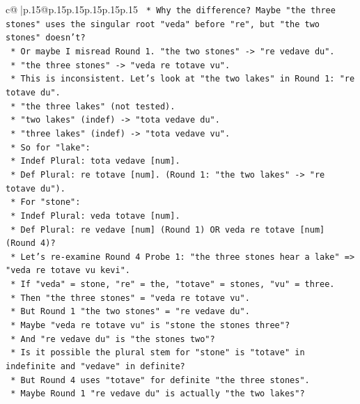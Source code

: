 \documentclass{article}
\begin{document}
{\begin{supertabular}{c@{$\;$}|p{.15\linewidth}@{}p{.15\linewidth}p{.15\linewidth}p{.15\linewidth}p{.15\linewidth}p{.15\linewidth}}
{{{\texttt{        *   Why the difference? Maybe "the three stones" uses the singular root "veda" before "re", but "the two stones" doesn't?} \\
\texttt{        *   Or maybe I misread Round 1. "the two stones" {-}> "re vedave du".} \\
\texttt{        *   "the three stones" {-}> "veda re totave vu".} \\
\texttt{        *   This is inconsistent. Let's look at "the two lakes" in Round 1: "re totave du".} \\
\texttt{        *   "the three lakes" (not tested).} \\
\texttt{        *   "two lakes" (indef) {-}> "tota vedave du".} \\
\texttt{        *   "three lakes" (indef) {-}> "tota vedave vu".} \\
\texttt{        *   So for "lake":} \\
\texttt{            *   Indef Plural: tota vedave {[}num{]}.} \\
\texttt{            *   Def Plural: re totave {[}num{]}. (Round 1: "the two lakes" {-}> "re totave du").} \\
\texttt{        *   For "stone":} \\
\texttt{            *   Indef Plural: veda totave {[}num{]}.} \\
\texttt{            *   Def Plural: re vedave {[}num{]} (Round 1) OR veda re totave {[}num{]} (Round 4)?} \\
\texttt{        *   Let's re{-}examine Round 4 Probe 1: "the three stones hear a lake" => "veda re totave vu kevi".} \\
\texttt{        *   If "veda" = stone, "re" = the, "totave" = stones, "vu" = three.} \\
\texttt{        *   Then "the three stones" = "veda re totave vu".} \\
\texttt{        *   But Round 1 "the two stones" = "re vedave du".} \\
\texttt{        *   Maybe "veda re totave vu" is "stone the stones three"?} \\
\texttt{        *   And "re vedave du" is "the stones two"?} \\
\texttt{        *   Is it possible the plural stem for "stone" is "totave" in indefinite and "vedave" in definite?} \\
\texttt{        *   But Round 4 uses "totave" for definite "the three stones".} \\
\texttt{        *   Maybe Round 1 "re vedave du" is actually "the two lakes"?} \\
}}}
\end{supertabular}}
\end{document}
